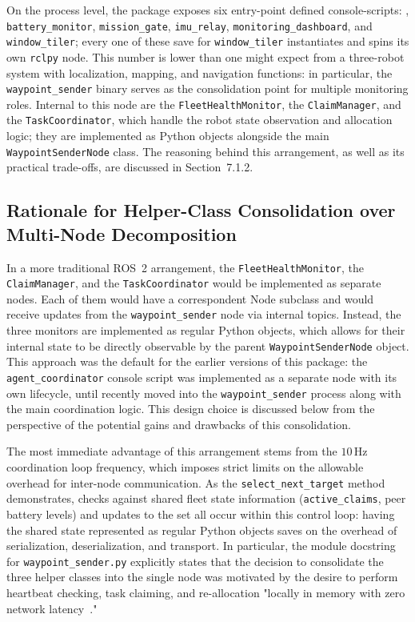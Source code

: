 On the process level, the package exposes six entry-point defined console-scripts: , \texttt{battery\_monitor}, \texttt{mission\_gate}, \texttt{imu\_relay}, \texttt{monitoring\_dashboard}, and \texttt{window\_tiler}; every one of these save for \texttt{window\_tiler} instantiates and spins its own \texttt{rclpy} node. This number is lower than one might expect from a three-robot system with localization, mapping, and navigation functions: in particular, the \texttt{waypoint\_sender} binary serves as the consolidation point for multiple monitoring roles. Internal to this node are the \texttt{FleetHealthMonitor}, the \texttt{ClaimManager}, and the \texttt{TaskCoordinator}, which handle the robot state observation and allocation logic; they are implemented as Python objects alongside the main \texttt{WaypointSenderNode} class. The reasoning behind this arrangement, as well as its practical trade-offs, are discussed in Section~7.1.2.

\subsection{Rationale for Helper-Class Consolidation over Multi-Node Decomposition}

In a more traditional ROS~2 arrangement, the \texttt{FleetHealthMonitor}, the \texttt{ClaimManager}, and the \texttt{Task\-Coordinator} would be implemented as separate nodes. Each of them would have a correspondent Node subclass and would receive updates from the \texttt{waypoint\_sender} node via internal topics. Instead, the three monitors are implemented as regular Python objects, which allows for their internal state to be directly observable by the parent \texttt{WaypointSenderNode} object. This approach was the default for the earlier versions of this package: the \texttt{agent\_coordinator} console script was implemented as a separate node with its own lifecycle, until recently moved into the \texttt{waypoint\_sender} process along with the main coordination logic. This design choice is discussed below from the perspective of the potential gains and drawbacks of this consolidation.

The most immediate advantage of this arrangement stems from the $10\,\text{Hz}$ coordination loop frequency, which imposes strict limits on the allowable overhead for inter-node communication. As the \texttt{select\_next\_target} method demonstrates, checks against shared fleet state information (\texttt{active\_claims}, peer battery levels) and updates to the  set all occur within this control loop: having the shared state represented as regular Python objects saves on the overhead of serialization, deserialization, and transport. In particular, the module docstring for \texttt{waypoint\_sender.py} explicitly states that the decision to consolidate the three helper classes into the single node was motivated by the desire to perform heartbeat checking, task claiming, and re-allocation "locally in memory with zero network latency~\cite{casini2023response}."

